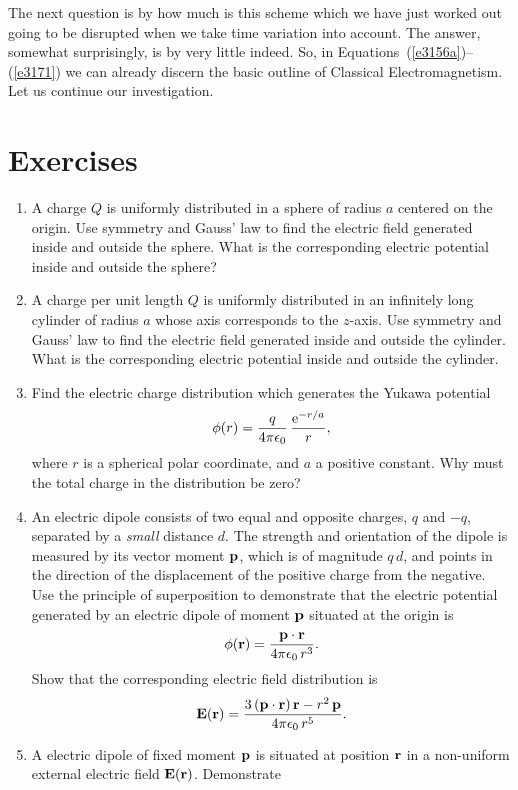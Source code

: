The next question  is by how much is this scheme which we have just worked out going to
be disrupted when we take time variation into account. The answer, somewhat
surprisingly, is by very little indeed. So, in Equations~(\ref{e3156a})--(\ref{e3171}) we can already
discern the basic outline of Classical Electromagnetism. Let us continue our
investigation.

{\small
\section{Exercises}
\renewcommand{\theenumi}{3.\arabic{enumi}}
\begin{enumerate}
\item A charge $Q$ is uniformly distributed in a sphere of radius $a$ centered
on the origin. Use symmetry and Gauss' law to find the electric field generated inside and
outside the sphere. What is the corresponding electric potential inside and
outside the sphere?
\item A charge per unit length $Q$ is uniformly distributed in an infinitely long cylinder
of radius $a$ whose axis corresponds to the $z$-axis. Use symmetry and  Gauss' law to
find the electric field generated inside and outside the cylinder. What is the
corresponding electric potential inside and outside the cylinder.
\item Find the electric charge distribution which generates the Yukawa
potential
$$
\phi(r) = \frac{q}{4\pi\epsilon_0}\,\frac{{\rm e}^{-r/a}}{r},
$$
where $r$ is a spherical polar coordinate, and $a$ a positive constant.
Why must the total charge in the distribution be zero?
\item An electric dipole consists of two equal and opposite charges, $q$ and $-q$, separated by a {\em small}\/ distance $d$. The strength and orientation of the dipole
is measured by its vector moment ${\bf p}$, which
is of magnitude $q\,d$, and points in the direction  of the displacement of the positive charge from the negative. Use the principle of superposition
to demonstrate that the electric potential generated by an electric dipole
of moment ${\bf p}$ situated at the origin is
$$
\phi({\bf r}) = \frac{{\bf p}\cdot{\bf r}}{4\pi\epsilon_0\,r^3}.
$$
Show that the corresponding electric field distribution is
$$
{\bf E}({\bf r}) = \frac{3\,({\bf p}\cdot{\bf r})\,{\bf r} - r^2\,{\bf p}}{4\pi\epsilon_0\,r^5}.
$$
\item A electric dipole of fixed moment ${\bf p}$ is situated at position
 ${\bf r}$ in a non-uniform external electric field ${\bf E}({\bf r})$. Demonstrate

\end{enumerate}}
